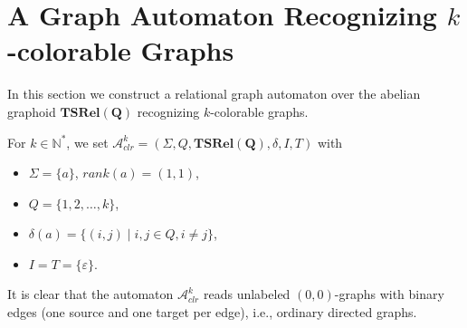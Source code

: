 \documentclass[runningheads,a4paper]{llncs}
\newcommand{\N}{\mathbb{N}}
\newcommand{\mc}{\mathcal}
\begin{document}
\section{A Graph Automaton Recognizing $k$-colorable Graphs}\label{S:4}

In this section we construct a relational graph automaton over the abelian graphoid $\mathbf{TSRel(Q)}$ recognizing $k$-colorable graphs.

For $k\in \N^*$, we set $\mc{A}^k_{clr}=(\Sigma,Q,\mathbf{TSRel(Q)},\delta,I,T)$ with
\begin{itemize}
  \item $\Sigma =\{a\}$, $rank(a)=(1,1)$,
  \item $Q=\{1,2,\dots ,k\}$,
  \item $\delta (a)=\{(i,j)\mid i,j\in Q, i\neq j\}$,
  \item $I=T=\{\varepsilon\}$.
\end{itemize}
It is clear that the automaton $\mc{A}^k_{clr}$ reads unlabeled $(0,0)$-graphs with binary edges (one source and one target per edge), i.e., ordinary directed graphs.
\end{document}
